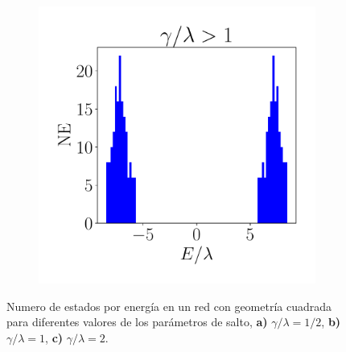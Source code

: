 \begin{figure}[h!]
\begin{subfigure}[b!]{0.3 \textwidth}
     \end{subfigure}\hspace*{1em}
     \begin{subfigure}[b!]{0.3 \textwidth}
         \caption{}
         \includegraphics[width=\textwidth]{Imagenes/Resultados_Hoti_Cuadrado/bars_square3.pdf}
     \end{subfigure}\hspace*{1em}\vspace*{-0.5em}
        \caption{Numero de estados por energía en un red con geometría cuadrada para diferentes valores de los parámetros de salto, \textbf{a)} $\gamma /\lambda = 1/2$, \textbf{b)} $\gamma /\lambda = 1$, \textbf{c)} $\gamma /\lambda = 2$.}
        \label{fig:Dos_Cuadrado}
\end{figure}